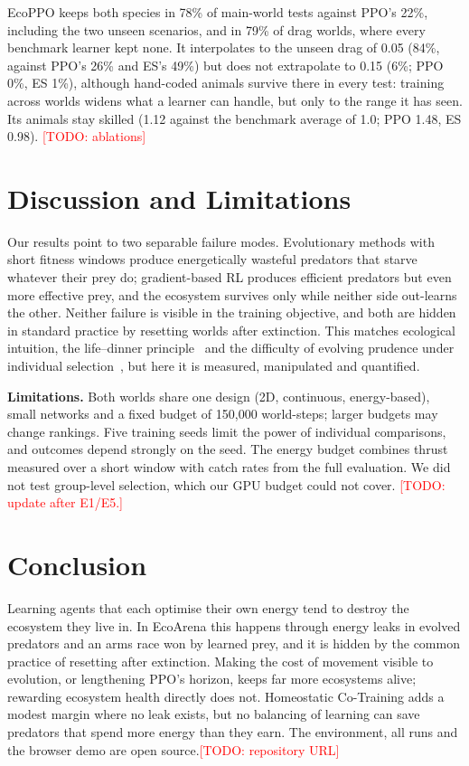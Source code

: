 \documentclass[conference]{IEEEtran}
\newcommand{\todo}[1]{\textcolor{red}{[TODO: #1]}}
\begin{document}
EcoPPO keeps both species in 78\% of main-world tests against PPO's 22\%, including the two unseen scenarios, and in 79\% of drag worlds, where every benchmark learner kept none. It interpolates to the unseen drag of 0.05 (84\%, against PPO's 26\% and ES's 49\%) but does not extrapolate to 0.15 (6\%; PPO 0\%, ES 1\%), although hand-coded animals survive there in every test: training across worlds widens what a learner can handle, but only to the range it has seen. Its animals stay skilled (1.12 against the benchmark average of 1.0; PPO 1.48, ES 0.98). \todo{ablations}

\section{Discussion and Limitations}

Our results point to two separable failure modes. Evolutionary methods with short fitness windows produce energetically wasteful predators that starve whatever their prey do; gradient-based RL produces efficient predators but even more effective prey, and the ecosystem survives only while neither side out-learns the other. Neither failure is visible in the training objective, and both are hidden in standard practice by resetting worlds after extinction. This matches ecological intuition, the life--dinner principle~\cite{dawkins1979} and the difficulty of evolving prudence under individual selection~\cite{slobodkin1968}, but here it is measured, manipulated and quantified.

\textbf{Limitations.} Both worlds share one design (2D, continuous, energy-based), small networks and a fixed budget of 150,000 world-steps; larger budgets may change rankings. Five training seeds limit the power of individual comparisons, and outcomes depend strongly on the seed. The energy budget combines thrust measured over a short window with catch rates from the full evaluation. We did not test group-level selection, which our GPU budget could not cover. \todo{update after E1/E5.}

\section{Conclusion}

Learning agents that each optimise their own energy tend to destroy the ecosystem they live in. In EcoArena this happens through energy leaks in evolved predators and an arms race won by learned prey, and it is hidden by the common practice of resetting after extinction. Making the cost of movement visible to evolution, or lengthening PPO's horizon, keeps far more ecosystems alive; rewarding ecosystem health directly does not. Homeostatic Co-Training adds a modest margin where no leak exists, but no balancing of learning can save predators that spend more energy than they earn. The environment, all runs and the browser demo are open source.\todo{repository URL}



\end{document}
